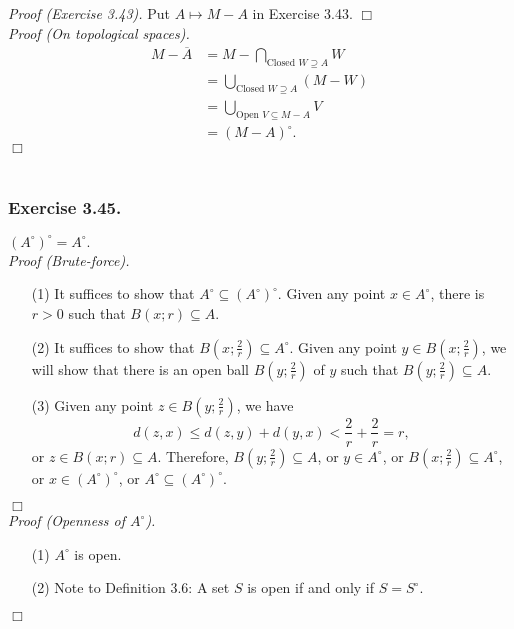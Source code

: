 \documentclass{article}
\begin{document}
\emph{Proof (Exercise 3.43).}
Put $A \mapsto M-A$ in Exercise 3.43.
$\Box$ \\

\emph{Proof (On topological spaces).}
\begin{align*}
M - \overline{A}
&= M - \bigcap_{\text{Closed } W \supseteq A} W \\
&= \bigcup_{\text{Closed } W \supseteq A} (M - W) \\
&= \bigcup_{\text{Open } V \subseteq M-A} V \\
&= (M - A)^{\circ}.
\end{align*}
$\Box$ \\\\






\subsubsection*{Exercise 3.45.}
\emph{$(A^{\circ})^{\circ} = A^{\circ}.$} \\

\emph{Proof (Brute-force).}
\begin{enumerate}
\item[(1)]
It suffices to show that $A^{\circ} \subseteq (A^{\circ})^{\circ}$.
Given any point $x \in A^{\circ}$, there is $r > 0$ such that $B(x;r) \subseteq A$.
\item[(2)]
It suffices to show that $B\left(x;\frac{2}{r}\right) \subseteq A^{\circ}$.
Given any point $y \in B\left(x;\frac{2}{r}\right)$,
we will show that there is an open ball $B\left(y;\frac{2}{r}\right)$ of $y$
such that $B\left(y;\frac{2}{r}\right) \subseteq A$.
\item[(3)]
Given any point $z \in B\left(y;\frac{2}{r}\right)$, we have
$$d(z,x) \leq d(z,y) + d(y,x) < \frac{2}{r} + \frac{2}{r} = r,$$
or $z \in B(x;r) \subseteq A$.
Therefore, $B\left(y;\frac{2}{r}\right) \subseteq A$,
or $y \in A^{\circ}$,
or $B\left(x;\frac{2}{r}\right) \subseteq A^{\circ}$,
or $x \in (A^{\circ})^{\circ}$,
or $A^{\circ} \subseteq (A^{\circ})^{\circ}$.
\end{enumerate}
$\Box$ \\

\emph{Proof (Openness of $A^{\circ}$).}
\begin{enumerate}
\item[(1)]
$A^{\circ}$ is open.
\item[(2)]
Note to Definition 3.6: A set $S$ is open if and only if $S = S^{\circ}$.
\end{enumerate}
$\Box$ \\\\
\end{document}
